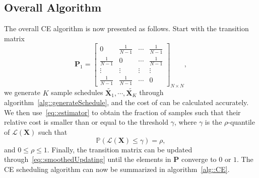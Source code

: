 \subsection{Overall Algorithm}
\label{sec::overallCE}
The overall CE algorithm is now presented as follows.
Start with the transition matrix
\begin{equation}
\mathbf{P}_1 = \left[ \begin{array}{cccc}
0 &\frac{1}{N-1} &\cdots &\frac{1}{N-1} \\
\frac{1}{N-1} &0 &\cdots &\frac{1}{N-1} \\
\vdots &\vdots &\vdots &\vdots \\
\frac{1}{N-1} &\frac{1}{N-1} &\cdots &0
\end{array} \right]_{N \times N},
\label{eq::initTransitionMatrix}
\end{equation}
we generate $K$ sample schedules ${\tilde{\mathbf{X}_1},\cdots,\tilde{\mathbf{X}_K}}$ through algorithm~\ref{alg::generateSchedule}, and the cost of can be calculated accurately.
We then use~\eqref{eq::estimator} to obtain the fraction of samples such that their relative cost is smaller than or equal to the threshold $\gamma$, where $\gamma$ is the $\rho$-quantile of $\mathcal{L}(\mathbf{X})$ such that
\begin{equation}
\mathbb{P}(\mathcal{L}(\mathbf{X}) \leq \gamma) = \rho,
\label{eq::quantile}
\end{equation}
and $0 \leq \rho \leq 1$.
Finally, the transition matrix can be updated through~\eqref{eq::smoothedUpdating} until the elements in $\mathbf{P}$ converge to $0$ or $1$.
The CE scheduling algorithm can now be summarized in algorithm~\ref{alg::CE}.
%
\IncMargin{1em}
